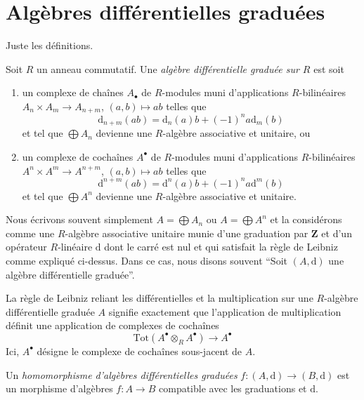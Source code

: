 \section{Algèbres différentielles graduées}
\label{section-dga}


\noindent
Juste les définitions.

\begin{definition}
\label{definition-dga}
Soit $R$ un anneau commutatif. Une {\it algèbre différentielle graduée sur $R$}
est soit
\begin{enumerate}
\item un complexe de chaînes $A_\bullet$ de $R$-modules muni d'applications
$R$-bilinéaires $A_n \times A_m \to A_{n + m}$, $(a, b) \mapsto ab$ telles que
$$
\text{d}_{n + m}(ab) = \text{d}_n(a)b + (-1)^n a\text{d}_m(b)
$$
et tel que $\bigoplus A_n$ devienne une $R$-algèbre associative et unitaire, ou
\item un complexe de cochaînes $A^\bullet$ de $R$-modules muni d'applications
$R$-bilinéaires $A^n \times A^m \to A^{n + m}$, $(a, b) \mapsto ab$
telles que
$$
\text{d}^{n + m}(ab) = \text{d}^n(a)b + (-1)^n a\text{d}^m(b)
$$
et tel que $\bigoplus A^n$ devienne une $R$-algèbre associative et unitaire.
\end{enumerate}
\end{definition}

\noindent
Nous écrivons souvent simplement $A = \bigoplus A_n$ ou $A = \bigoplus A^n$ et
la considérons comme une $R$-algèbre associative unitaire munie d'une graduation
par $\mathbf{Z}$ et d'un opérateur $R$-linéaire $\text{d}$ dont le carré est nul et
qui satisfait la règle de Leibniz comme expliqué ci-dessus. Dans ce cas, nous
disons souvent ``Soit $(A, \text{d})$ une algèbre différentielle graduée''.

\medskip\noindent
La règle de Leibniz reliant les différentielles et la multiplication sur une
$R$-algèbre différentielle graduée $A$ signifie exactement que l'application de
multiplication définit une application de complexes de cochaînes
$$
\text{Tot}(A^\bullet \otimes_R A^\bullet) \to A^\bullet
$$
Ici, $A^\bullet$ désigne le complexe de cochaînes sous-jacent de $A$.

\begin{definition}
\label{definition-homomorphism-dga}
Un {\it homomorphisme d'algèbres différentielles graduées} $f : (A, \text{d}) \to
(B, \text{d})$ est un morphisme d'algèbres $f : A \to B$ compatible avec les
graduations et $\text{d}$.
\end{definition}


